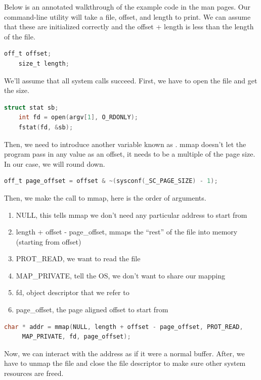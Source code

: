 Below is an annotated walkthrough of the example code in the man pages.
Our command-line utility will take a file, offset, and length to print.
We can assume that these are initialized correctly and the offset + length is less than the length of the file.
	 
\begin{lstlisting}[language=C]
	off_t offset;
	size_t length;
\end{lstlisting}
	 
We'll assume that all system calls succeed.
First, we have to open the file and get the size.
	 
\begin{lstlisting}[language=C]
	struct stat sb;
	int fd = open(argv[1], O_RDONLY);
	fstat(fd, &sb);
\end{lstlisting}
	 
Then, we need to introduce another variable known as .
mmap doesn't let the program pass in any value as an offset, it needs to be a multiple of the page size.
In our case, we will round down.
	 
\begin{lstlisting}[language=C]
	off_t page_offset = offset & ~(sysconf(_SC_PAGE_SIZE) - 1);
\end{lstlisting}
	 
Then, we make the call to mmap, here is the order of arguments.
\begin{enumerate}
	\item NULL, this tells mmap we don't need any particular address to start from
	\item length + offset - page\_offset, mmaps the ``rest'' of the file into memory (starting from offset)
	\item PROT\_READ, we want to read the file
	\item MAP\_PRIVATE, tell the OS, we don't want to share our mapping
	\item fd, object descriptor that we refer to
	\item page\_offset, the page aligned offset to start from
\end{enumerate}
	 
\begin{lstlisting}[language=C]
	char * addr = mmap(NULL, length + offset - page_offset, PROT_READ,
	 MAP_PRIVATE, fd, page_offset);
\end{lstlisting}
	 
Now, we can interact with the address as if it were a normal buffer.
After, we have to unmap the file and close the file descriptor to make sure other system resources are freed.
	 
